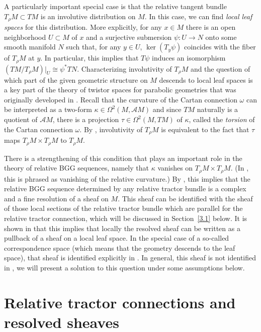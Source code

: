 \documentclass[pdftex]{sigma}
\numberwithin{equation}{section}
\def\Cal{\mathcal}
\newcommand{\x}{\times}
\newcommand{\ka}{\kappa}
\newcommand{\om}{\omega}
\newcommand{\ps}{\psi}
\newcommand{\Om}{\Omega}
\begin{document}
A particularly important special case is that the relative tangent bundle $T_\rho
M\subset TM$ is an involutive distribution on $M$. In this case, we can find
\textit{local leaf spaces} for this distribution. More explicitly, for any $x\in M$
there is an open neighborhood $U\subset M$ of $x$ and a surjective submersion
$\ps\colon U\to N$ onto some smooth manifold $N$ such that, for any $y\in U$,
$\ker(T_y\ps)$ coincides with the fiber of $T_\rho M$ at $y$. In particular, this
implies that $T\ps$ induces an isomorphism $(TM/T_\rho
M)|_U\cong\psi^*TN$. Characterizing involutivity of $T_\rho M$ and the question of
which part of the given geometric structure on $M$ descends to local leaf spaces is a
key part of the theory of twistor spaces for parabolic geometries that was originally
developed in \cite{twistor}. Recall that the curvature of the Cartan connection $\om$
can be interpreted as a two-form $\ka\in\Om^2(M,\Cal AM)$ and since $TM$ naturally is
a quotient of $\Cal AM$, there is a projection $\tau\in\Om^2(M,TM)$ of $\ka$, called
the \textit{torsion} of the Cartan connection $\om$. By \cite[Proposition 4.6]{Rel-BGG2},
involutivity of $T_\rho M$ is equivalent to the fact that $\tau$
maps $T_\rho M\x T_\rho M$ to $T_\rho M$.

There is a strengthening of this condition that plays an important role in the theory
of relative BGG sequences, namely that $\ka$ vanishes on $T_\rho M\x T_\rho M$. (In
\cite{Rel-BGG2}, this is phrased as vanishing of the relative curvature.) By \cite[Theorem 4.11]{Rel-BGG2},
this implies that the relative BGG sequence determined by
any relative tractor bundle is a complex and a fine resolution of a sheaf on
$M$. This sheaf can be identified with the sheaf of those local sections of the
relative tractor bundle which are parallel for the relative tractor connection, which
will be discussed in Section~\ref{3.1} below. It is shown in \cite[Section 4.7]{Rel-BGG2}
that this implies that locally the resolved sheaf can be written as a pullback of a
sheaf on a local leaf space. In the special case of a so-called correspondence space
(which means that the geometry descends to the leaf space), that sheaf is identified
explicitly in \cite[Theorem 4.11]{Rel-BGG2}. In general, this sheaf is not
identified in \cite{Rel-BGG2}, we will present a solution to this question under some
assumptions below.

\section{Relative tractor connections and resolved sheaves}\label{3}
\end{document}
